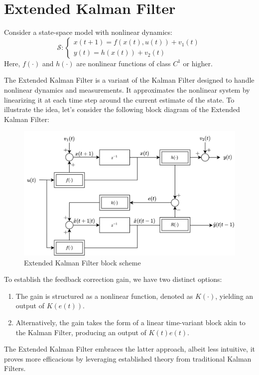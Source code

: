\section{Extended Kalman Filter}

Consider a state-space model with nonlinear dynamics:
\[\mathcal{S}:\begin{cases}
    x(t+1)=f(x(t),u(t))+v_1(t) \\
    y(t)=h(x(t))+v_2(t)
\end{cases}\]
Here, $f(\cdot)$ and $h(\cdot)$ are nonlinear functions of class $C^1$ or higher.

The Extended Kalman Filter is a variant of the Kalman Filter designed to handle nonlinear dynamics and measurements. 
It approximates the nonlinear system by linearizing it at each time step around the current estimate of the state.
To illustrate the idea, let's consider the following block diagram of the Extended Kalman Filter:
\begin{figure}[H]
    \centering
    \includegraphics[width=0.75\linewidth]{images/ekf.png}
    \caption{Extended Kalman Filter block scheme}
\end{figure}
To establish the feedback correction gain, we have two distinct options:
\begin{enumerate}
    \item The gain is structured as a nonlinear function, denoted as $K(\cdot)$, yielding an output of $K(e(t))$. 
    \item Alternatively, the gain takes the form of a linear time-variant block akin to the Kalman Filter, producing an output of $K(t)e(t)$. 
\end{enumerate}
The Extended Kalman Filter embraces the latter approach, albeit less intuitive, it proves more efficacious by leveraging established theory from traditional Kalman Filters.

